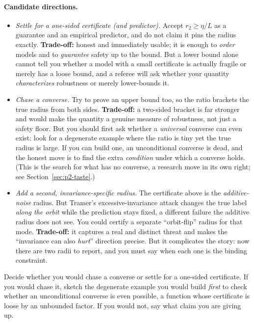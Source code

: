 \paragraph{Candidate directions.}
\begin{itemize}[leftmargin=1.4em]
  \item \emph{Settle for a one-sided certificate (and predictor).} Accept $r_2 \ge \eta/L$ as a
        guarantee and an empirical predictor, and do not claim it pins the radius exactly.
        \textbf{Trade-off:} honest and immediately usable; it is enough to \emph{order} models and to
        \emph{guarantee} safety up to the bound. But a lower bound alone cannot tell you whether a
        model with a small certificate is actually fragile or merely has a loose bound, and a
        referee will ask whether your quantity \emph{characterizes} robustness or merely lower-bounds
        it.
  \item \emph{Chase a converse.} Try to prove an upper bound too, so the ratio brackets the true
        radius from both sides. \textbf{Trade-off:} a two-sided bracket is far stronger and would
        make the quantity a genuine measure of robustness, not just a safety floor. But you should
        first ask whether a \emph{universal} converse can even exist: look for a degenerate example
        where the ratio is tiny yet the true radius is large. If you can build one, an unconditional
        converse is dead, and the honest move is to find the extra \emph{condition} under which a
        converse holds. (This is the search for what has no converse, a research move in its own
        right; see Section~\ref{sec:p2-taste}.)
  \item \emph{Add a second, invariance-specific radius.} The certificate above is the
        \emph{additive-noise} radius. But Tramer's excessive-invariance attack changes the true label
        \emph{along the orbit} while the prediction stays fixed, a different failure the additive
        radius does not see. You could certify a separate ``orbit-flip'' radius for that mode.
        \textbf{Trade-off:} it captures a real and distinct threat and makes the ``invariance can
        also \emph{hurt}'' direction precise. But it complicates the story: now there are two
        radii to report, and you must say when each one is the binding constraint.
\end{itemize}

\begin{problem}
Decide whether you would chase a converse or settle for a one-sided certificate. If you would chase
it, sketch the degenerate example you would build \emph{first} to check whether an unconditional
converse is even possible, a function whose certificate is loose by an unbounded factor. If you
would not, say what claim you are giving up.
\end{problem}

